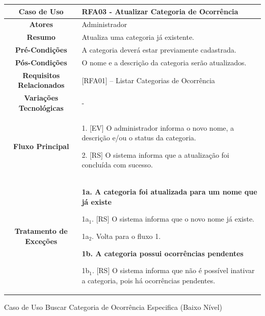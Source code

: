 \begin{apendicesenv}
\begin{quadro}[htb]
	\begin{tabular}{|c|p{11cm}|}
		\hline
		\textbf{Caso de Uso} & RFA03 - Atualizar Categoria de Ocorrência \\ \hline
		\textbf{Atores} & Administrador \\ \hline
		\textbf{Resumo} & Atualiza uma categoria já existente. \\ \hline
		\textbf{Pré-Condições} & A categoria deverá estar previamente cadastrada. \\ \hline
		\textbf{Pós-Condições} & O nome e a descrição da categoria serão atualizados. \\ \hline
		\textbf{Requisitos Relacionados} & [RFA01] -- Listar Categorias de Ocorrência \\ \hline
		\textbf{Variações Tecnológicas} & - \\ \hline
		
		\textbf{Fluxo Principal} &
		\parbox[t]{11cm}{
			\raggedright
			1. [EV] O administrador informa o novo nome, a descrição e/ou o status da categoria.\par
			2. [RS] O sistema informa que a atualização foi concluída com sucesso.
		}
		\\ \hline
		
		\textbf{Tratamento de Exceções} &
		\parbox[t]{11cm}{
			\raggedright
			\textbf{1a. A categoria foi atualizada para um nome que já existe}\par
			1a$_1$. [RS] O sistema informa que o novo nome já existe.\par
			1a$_2$. Volta para o fluxo 1.\par
			
			\textbf{1b. A categoria possui ocorrências pendentes}\par
			1b$_1$. [RS] O sistema informa que não é possível inativar a categoria, pois há ocorrências pendentes.
		}
		\\ \hline
	\end{tabular}
	
\end{quadro}

\begin{quadro}[htb]
	\centering
	\caption{\label{quadro_rfa04}Caso de Uso Buscar Categoria de Ocorrência Especifica (Baixo Nível)}
	\small
	\renewcommand{\arraystretch}{1.1}
	

\end{quadro}
\end{apendicesenv}

